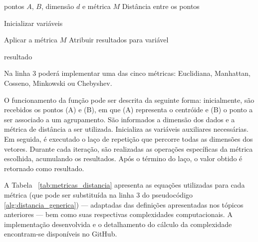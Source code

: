 \documentclass[10pt,a4paper,twocolumn]{article}
\begin{document}
\begin{algorithm}[H]
\caption{calcularDistancia()}
\label{alg:distancia_generica}
\begin{algorithmic}[1]

\Require pontos $A$, $B$, dimensão $d$ e métrica $M$
\Ensure Distância entre os pontos

\State Inicializar variáveis

    \State Aplicar a métrica $M$
    \State Atribuir resultados para variável
\EndFor

\State \Return resultado

\end{algorithmic}
\end{algorithm} 

Na linha 3 poderá implementar uma das cinco métricas: Euclidiana, Manhattan, Cosseno, Minkowski ou Chebyshev. 

O funcionamento da função pode ser descrita da seguinte forma: inicialmente, são recebidos os pontos (A) e (B), em que (A) representa o centróide e (B) o ponto a ser associado a um agrupamento. São informados a dimensão dos dados e a métrica de distância a ser utilizada. Inicializa as variáveis auxiliares necessárias. Em seguida, é executado o laço de repetição que percorre todas as dimensões dos vetores. Durante cada iteração, são realizadas as operações específicas da métrica escolhida, acumulando os resultados. Após o término do laço, o valor obtido é retornado como resultado.


A Tabela ~\ref{tab:metricas_distancia} apresenta as equações utilizadas para cada métrica (que pode ser substituída na linha 3 do pseudocódigo \ref{alg:distancia_generica}) — adaptadas das definições apresentadas nos tópicos anteriores — bem como suas respectivas complexidades computacionais. A implementação desenvolvida e o detalhamento do cálculo da complexidade encontram-se disponíveis no GitHub.
\end{document}

